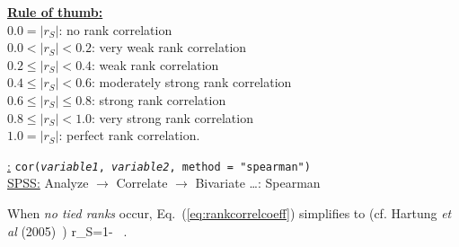 \medskip
\noindent
\underline{\textbf{Rule of thumb:}}\\
$0.0 = |r_{S}|$: no rank correlation\\
$0.0 < |r_{S}| < 0.2$: very weak rank correlation\\
$0.2 \leq |r_{S}| < 0.4$: weak rank correlation\\
$0.4 \leq |r_{S}| < 0.6$: moderately strong rank correlation\\
$0.6 \leq |r_{S}| \leq 0.8$: strong rank correlation\\
$0.8 \leq |r_{S}| < 1.0$: very strong rank correlation\\
$1.0=|r_{S}|$: perfect rank correlation.

\medskip
\noindent
\underline{\R:} \texttt{cor(\textit{variable1},
\textit{variable2}, method = "spearman")} \\
\underline{SPSS:} Analyze $\rightarrow$ Correlate
$\rightarrow$ Bivariate \ldots: Spearman

\medskip
\noindent
When \textit{no tied ranks} occur, Eq.~(\ref{eq:rankcorrelcoeff})
simplifies to (cf. Hartung \textit{et al} 
(2005)~)
%
\be
r_{S}=1-
\ .
\ee
%

